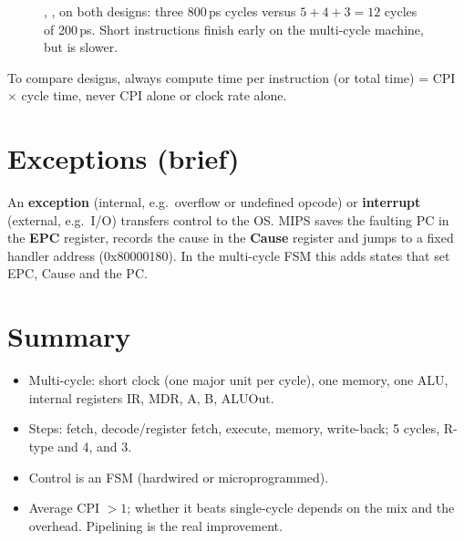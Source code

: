 \begin{figure}[H]
\centering
{}
\caption{, ,  on both designs: three 800\,ps
cycles versus $5 + 4 + 3 = 12$ cycles of 200\,ps. Short instructions finish
early on the multi-cycle machine, but  is slower.}
\end{figure}

\begin{important}
To compare designs, always compute time per instruction (or total time) =
CPI $\times$ cycle time, never CPI alone or clock rate alone.
\end{important}

\section{Exceptions (brief)}

An \textbf{exception} (internal, e.g.\ overflow or undefined opcode) or
\textbf{interrupt} (external, e.g.\ I/O) transfers control to the OS. MIPS
saves the faulting PC in the \textbf{EPC} register, records the cause in
the \textbf{Cause} register and jumps to a fixed handler address
(0x80000180). In the multi-cycle FSM this adds states that set EPC, Cause
and the PC.

\section*{Summary}
\begin{itemize}
  \item Multi-cycle: short clock (one major unit per cycle), one memory, one
    ALU, internal registers IR, MDR, A, B, ALUOut.
  \item Steps: fetch, decode/register fetch, execute, memory, write-back;
     5 cycles, R-type and  4,  and  3.
  \item Control is an FSM (hardwired or microprogrammed).
  \item Average CPI $> 1$; whether it beats single-cycle depends on the mix
    and the overhead. Pipelining is the real improvement.
\end{itemize}
